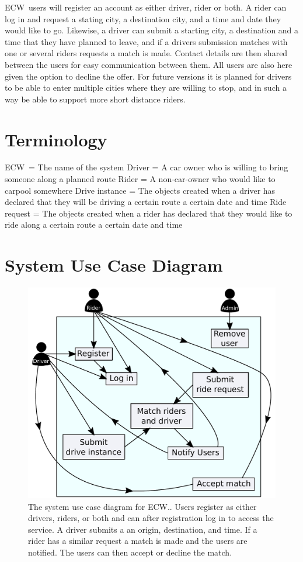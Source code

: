 \documentclass{article}
\newcommand{\name}{ECW\ }
\newcommand{\namep}{ECW.}
\begin{document}
\name users will register an account as either driver, rider or both. A rider can log in and request a stating city, a destination city, and a time and date they would like to go. Likewise, a driver can submit a starting city, a destination and a time that they have planned to leave, and if a drivers submission matches with one or several riders requests a match is made. Contact details are then shared between the users for easy communication between them. All users are also here given the option to decline the offer. For future versions it is planned for drivers to be able to enter multiple cities where they are willing to stop, and in such a way be able to support more short distance riders.

\section{Terminology}
\name = The name of the system\newline
Driver = A car owner who is willing to bring someone along a planned route\newline
Rider = A non-car-owner who would like to carpool somewhere\newline
Drive instance = The objects created when a driver has declared that they will be driving a certain route a certain date and time
Ride request = The objects created when a rider has declared that they would like to ride along a certain route a certain date and time

\newpage
\section{System Use Case Diagram}
\begin{figure}[!htpb]
    \centering
    \includegraphics[scale=0.75]{system_case_diagram.pdf}
    \caption{The system use case diagram for \namep. Users register as either drivers, riders, or both and can after registration log in to access the service. A driver submits a an origin, destination, and time. If a rider has a similar request a match is made and the users are notified. The users can then accept or decline the match.}
    \label{fig:useCaseDiagram}
\end{figure}
\end{document}

